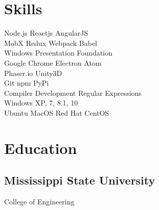\documentclass[]{resume}
\begin{document}
%
%
\header

%
%
\begin{minipage}[t]{0.33\textwidth}

\section{Skills}
Node.js \textbullet{} Reactjs \textbullet{} AngularJS \\
MobX \textbullet{} Redux \textbullet{} Webpack \textbullet{} Babel \\
Windows Presentation Foundation \\

Google Chrome \textbullet{} Electron \textbullet{} Atom \\
Phaser.io \textbullet{} Unity3D \\

Git \textbullet{} npm \textbullet{} PyPi \\
Compiler Development \textbullet{} Regular Expressions \\

Windows XP, 7, 8.1, 10 \\
Ubuntu \textbullet{} MacOS \textbullet{} Red Hat \textbullet{} CentOS \\

\sectionsep

\section{Education}

\subsection{Mississippi State University}
College of Engineering \\


\end{minipage}
\end{document}
